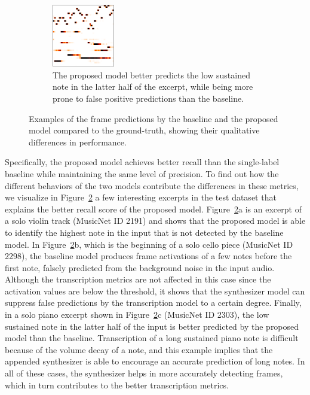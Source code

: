 \begin{figure}
\begin{subfigure}[b]{\textwidth}
		\includegraphics[width=0.3\textwidth]{cropped/2303-proposed.png}
		\caption{The proposed model better predicts the low sustained note in the latter half of the excerpt, while being more prone to false positive predictions than the baseline.}
		\label{}
	\end{subfigure}
	\caption{Examples of the frame predictions by the baseline and the proposed model compared to the ground-truth, showing their qualitative differences in performance. }\label{fig:frame-prediction-excerpts}
\end{figure}

Specifically, the proposed model achieves better recall than the single-label baseline while maintaining the same level of precision.
To find out how the different behaviors of the two models contribute the differences in these metrics, we visualize in Figure~\ref{fig:frame-prediction-excerpts} a few interesting excerpts in the test dataset that explains the better recall score of the proposed model.
Figure~\ref{fig:frame-prediction-excerpts}a is an excerpt of a solo violin track (MusicNet ID 2191) and shows that the proposed model is able to identify the highest note in the input that is not detected by the baseline model.
In Figure~\ref{fig:frame-prediction-excerpts}b, which is the beginning of a solo cello piece (MusicNet ID 2298), the baseline model produces frame activations of a few notes before the first note, falsely predicted from the background noise in the input audio.
Although the transcription metrics are not affected in this case since the activation values are below the threshold, it shows that the synthesizer model can suppress false predictions by the transcription model to a certain degree.
Finally, in a solo piano excerpt shown in Figure~\ref{fig:frame-prediction-excerpts}c (MusicNet ID 2303), the low sustained note in the latter half of the input is better predicted by the proposed model than the baseline.
Transcription of a long sustained piano note is difficult because of the volume decay of a note, and this example implies that the appended synthesizer is able to encourage an accurate prediction of long notes.
In all of these cases, the synthesizer helps in more accurately detecting frames, which in turn contributes to the better transcription metrics.


